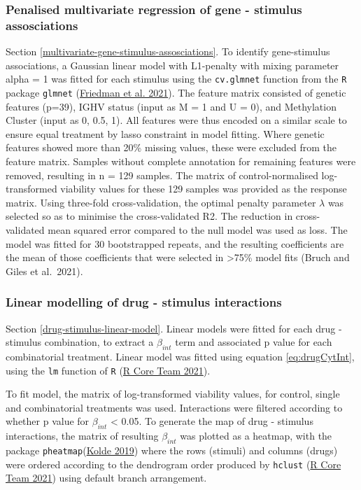 \documentclass[11pt, a4paper, twosided]{book}
\begin{document}
\hypertarget{multivariate-gene-stimulus-assosciations-method}{%
\subsubsection{Penalised multivariate regression of gene - stimulus assosciations}\label{multivariate-gene-stimulus-assosciations-method}}

Section \ref{multivariate-gene-stimulus-assosciations}. To identify gene-stimulus associations, a Gaussian linear model with L1-penalty with mixing parameter alpha = 1 was fitted for each stimulus using the \texttt{cv.glmnet} function from the \texttt{R} package \texttt{glmnet} (\protect\hyperlink{ref-R-glmnet}{Friedman et al. 2021}). The feature matrix consisted of genetic features (p=39), IGHV status (input as M = 1 and U = 0), and Methylation Cluster (input as 0, 0.5, 1). All features were thus encoded on a similar scale to ensure equal treatment by lasso constraint in model fitting. Where genetic features showed more than 20\% missing values, these were excluded from the feature matrix. Samples without complete annotation for remaining features were removed, resulting in n = 129 samples. The matrix of control-normalised log-transformed viability values for these 129 samples was provided as the response matrix. Using three-fold cross-validation, the optimal penalty parameter \(\lambda\) was selected so as to minimise the cross-validated R2. The reduction in cross-validated mean squared error compared to the null model was used as loss. The model was fitted for 30 bootstrapped repeats, and the resulting coefficients are the mean of those coefficients that were selected in \textgreater75\% model fits (Bruch and Giles et al.~2021).

\hypertarget{drug-stimulus-linear-model-method}{%
\subsubsection{Linear modelling of drug - stimulus interactions}\label{drug-stimulus-linear-model-method}}

Section \ref{drug-stimulus-linear-model}. Linear models were fitted for each drug - stimulus combination, to extract a \(\beta_{int}\) term and associated p value for each combinatorial treatment. Linear model was fitted using equation \eqref{eq:drugCytInt}, using the \texttt{lm} function of \texttt{R} (\protect\hyperlink{ref-R-base}{R Core Team 2021}).

To fit model, the matrix of log-transformed viability values, for control, single and combinatorial treatments was used. Interactions were filtered according to whether p value for \(\beta_{int}\) \textless{} 0.05. To generate the map of drug - stimulus interactions, the matrix of resulting \(\beta_{int}\) was plotted as a heatmap, with the package \texttt{pheatmap}(\protect\hyperlink{ref-R-pheatmap}{Kolde 2019}) where the rows (stimuli) and columns (drugs) were ordered according to the dendrogram order produced by \texttt{hclust} (\protect\hyperlink{ref-R-base}{R Core Team 2021}) using default branch arrangement.
\end{document}
